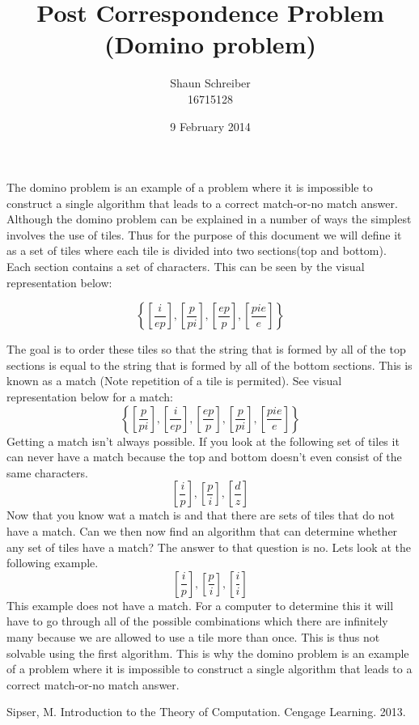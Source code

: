 \documentclass[A4paper, 10pt]{article}
\title{Post Correspondence Problem \\ (Domino problem)}
\author{Shaun Schreiber \\ 16715128}
\date{9 February 2014}
\begin{document}
\maketitle

\noindent The domino problem is an example of a problem where it is impossible to construct a single algorithm that
leads to a correct match-or-no match answer. Although the domino problem can be explained in a number of ways the simplest involves the use of tiles. Thus for the purpose of this document we will define it as a set of tiles where each tile is divided into two sections(top and bottom). Each section contains a set of characters. This can be seen by the visual representation below:

\[\left\{\left[\frac{i}{ep}\right], \left[\frac{p}{pi}\right],\left[\frac{ep}{p}\right],\left[\frac{pie}{e}\right]\right\}\]

\noindent The goal is to order these tiles so that the string that is formed by all of the top sections is equal to the string that is formed by all of the
bottom sections. This is known as a match (Note repetition of a tile is permited). See visual representation below for a match:
\[\left\{\left[\frac{p}{pi}\right], \left[\frac{i}{ep}\right],\left[\frac{ep}{p}\right],\left[\frac{p}{pi}\right],\left[\frac{pie}{e}\right]\right\}\]
Getting a match isn't always possible. If you look at the following set of tiles it can never have a match because the top and bottom doesn't even consist of
the same characters.
\[\left[\frac{i}{p}\right], \left[\frac{p}{i}\right],\left[\frac{d}{z}\right]\]
Now that you know wat a match is and that there are sets of tiles that do not have a match. Can we then now find an algorithm
that can determine whether any set of tiles have a match? The answer to that question is no. Lets look at the following example.
\[\left[\frac{i}{p}\right], \left[\frac{p}{i}\right],\left[\frac{i}{i}\right]\]
This example does not have a match. For a computer to determine this it will have to go through all of the possible combinations which there are infinitely 
many because we are allowed to use a tile more than once. This is thus not solvable using the first algorithm. This is why the domino problem is an example of a problem where it is impossible to construct a single algorithm that
leads to a correct match-or-no match answer.
\begin{thebibliography}{0}
 Sipser, M. Introduction to the Theory of Computation. Cengage Learning. 2013.
\end{thebibliography}
\end{document}
